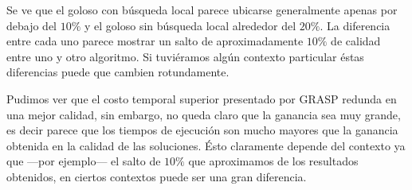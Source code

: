 Se ve que el goloso con búsqueda local parece ubicarse generalmente apenas por debajo del $10\%$ y 
el goloso sin búsqueda local alrededor del $20\%$. La diferencia entre cada uno parece mostrar
un salto de aproximadamente $10\%$ de calidad entre uno y otro algoritmo. Si tuviéramos algún 
contexto particular éstas diferencias puede que cambien rotundamente.

Pudimos ver que el costo temporal superior presentado por GRASP redunda en una mejor calidad, 
sin embargo, no queda claro que la ganancia sea muy grande, es decir parece que los tiempos
de ejecución son mucho mayores que la ganancia obtenida en la calidad de las soluciones. Ésto
claramente depende del contexto ya que ---por ejemplo--- el salto de $10\%$ que aproximamos de los
resultados obtenidos, en ciertos contextos puede ser una gran diferencia.


%
%
%
%
